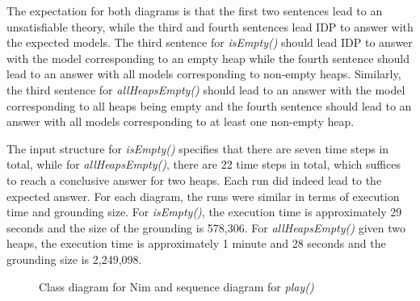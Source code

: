 \documentclass[conference]{IEEEtran}
\begin{document}
The expectation for both diagrams is that the first two sentences lead to an unsatisfiable theory, while the third and fourth sentences lead IDP to answer with the expected models. The third sentence for \textit{isEmpty()} should lead IDP to answer with the model corresponding to an empty heap while the fourth sentence should lead to an answer with all models corresponding to non-empty heaps. Similarly, the third sentence for \textit{allHeapsEmpty()} should lead to an answer with the model corresponding to all heaps being empty and the fourth sentence should lead to an answer with all models corresponding to at least one non-empty heap.

The input structure for \textit{isEmpty()} specifies that there are seven time steps in total, while for \textit{allHeapsEmpty()}, there are 22 time steps in total, which suffices to reach a conclusive answer for two heaps. Each run did indeed lead to the expected answer. For each diagram, the runs were similar in terms of execution time and grounding size. For \textit{isEmpty()}, the execution time is approximately 29 seconds and the size of the grounding is 578,306. For \textit{allHeapsEmpty()} given two heaps, the execution time is approximately 1 minute and 28 seconds and the grounding size is 2,249,098.

\begin{figure}[!t]
	\centering
	\hfil
		\label{fig:play}
	\caption{Class diagram for Nim and sequence diagram for \textit{play()}}
	\label{fig:nim-cd-play}
\end{figure}
\end{document}
